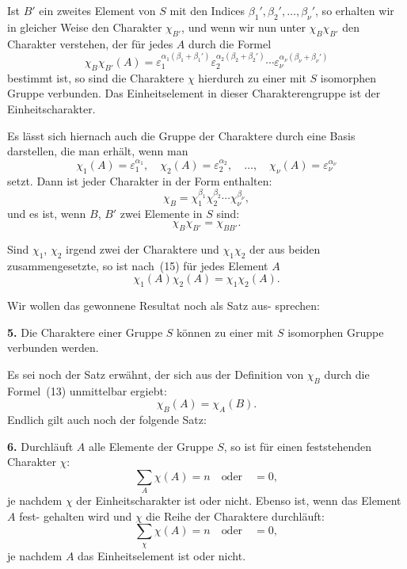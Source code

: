 \documentclass[12pt,a4paper]{article}
\theoremstyle{plain}
\theoremstyle{definition}
\theoremstyle{remark}
\begin{document}
Ist $B'$ ein zweites Element von $S$ mit den Indices $\beta_1', \beta_2', \ldots, \beta_\nu'$,
so erhalten wir in gleicher Weise den Charakter $\chi_{B'}$, und wenn
wir nun unter $\chi_B \chi_{B'}$ den Charakter verstehen, der für jedes $A$
durch die Formel
\begin{equation}\tag{15}
\chi_B \chi_{B'}(A) = \varepsilon_1^{\alpha_1(\beta_1 + \beta_1')} \varepsilon_2^{\alpha_2(\beta_2 + \beta_2')} \cdots \varepsilon_\nu^{\alpha_\nu(\beta_\nu + \beta_\nu')}
\end{equation}
bestimmt ist, so sind die Charaktere $\chi$ hierdurch zu einer mit $S$
isomorphen Gruppe verbunden. Das Einheitselement in dieser
Charakterengruppe ist der Einheitscharakter.

Es lässt sich hiernach auch die Gruppe der Charaktere
durch eine Basis darstellen, die man erhält, wenn man
\begin{equation}\tag{16}
\chi_1(A) = \varepsilon_1^{\alpha_1}, \quad \chi_2(A) = \varepsilon_2^{\alpha_2}, \quad \ldots, \quad \chi_\nu(A) = \varepsilon_\nu^{\alpha_\nu}
\end{equation}
setzt. Dann ist jeder Charakter in der Form enthalten:
\begin{equation}\tag{17}
\chi_B = \chi_1^{\beta_1} \chi_2^{\beta_2} \cdots \chi_\nu^{\beta_\nu},
\end{equation}
und es ist, wenn $B$, $B'$ zwei Elemente in $S$ sind:
\begin{equation}\tag{18}
\chi_B \chi_{B'} = \chi_{BB'}.
\end{equation}

Sind $\chi_1$, $\chi_2$ irgend zwei der Charaktere und $\chi_1 \chi_2$ der aus
beiden zusammengesetzte, so ist nach~(15) für jedes Element $A$
\begin{equation}\tag{19}
\chi_1(A) \chi_2(A) = \chi_1 \chi_2(A).
\end{equation}

Wir wollen das gewonnene Resultat noch als Satz aus-
sprechen:

\textbf{5.} Die Charaktere einer Gruppe $S$ können zu einer
mit $S$ isomorphen Gruppe verbunden werden.

Es sei noch der Satz erwähnt, der sich aus der Definition
von $\chi_B$ durch die Formel~(13) unmittelbar ergiebt:
\begin{equation}\tag{20}
\chi_B(A) = \chi_A(B).
\end{equation}
Endlich gilt auch noch der folgende Satz:

\textbf{6.} Durchläuft $A$ alle Elemente der Gruppe $S$, so ist
für einen feststehenden Charakter $\chi$:
\begin{equation}\tag{21}
\sum_A \chi(A) = n \quad \text{oder} \quad = 0,
\end{equation}
je nachdem $\chi$ der Einheitscharakter ist oder
nicht. Ebenso ist, wenn das Element $A$ fest-
gehalten wird und $\chi$ die Reihe der Charaktere
durchläuft:
\begin{equation}\tag{22}
\sum_\chi \chi(A) = n \quad \text{oder} \quad = 0,
\end{equation}
je nachdem $A$ das Einheitselement ist oder
nicht.
\end{document}
